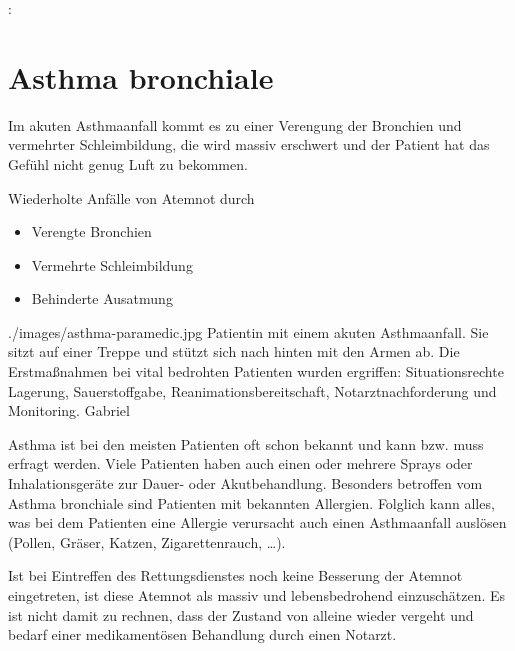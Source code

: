  {%
: 
\\
}{}

 

\nocite{Wuttig2009}


\section{Asthma bronchiale}
\label{topic:asthma-bronchiale}

{%
Im akuten Asthmaanfall kommt es zu einer Verengung der
Bronchien und vermehrter Schleimbildung, die 
wird massiv erschwert und der Patient hat das Gefühl nicht
genug Luft zu bekommen.
}{%
Wiederholte Anfälle von Atemnot durch
\begin{itemize}
  \item Verengte Bronchien
  \item Vermehrte Schleimbildung
  \item Behinderte Ausatmung
\end{itemize}
}
{./images/asthma-paramedic.jpg}
{Patientin mit einem akuten Asthmaanfall. Sie sitzt auf einer Treppe und stützt sich nach hinten mit
den Armen ab. Die Erstmaßnahmen bei vital bedrohten
Patienten wurden ergriffen: Situationsrechte Lagerung,
Sauerstoffgabe, Reanimationsbereitschaft, Notarztnachforderung und Monitoring.\label{fig:asthma-paramedic}
}
{Gabriel}

Asthma ist bei den meisten Patienten oft schon bekannt und
kann bzw. muss erfragt werden. Viele Patienten haben auch
einen oder mehrere Sprays oder Inhalationsgeräte zur Dauer-
oder Akutbehandlung. 
Besonders betroffen vom Asthma bronchiale sind Patienten
mit bekannten Allergien. Folglich kann alles, was bei dem
Patienten eine Allergie verursacht auch einen Asthmaanfall
auslösen (Pollen, Gräser, Katzen, Zigarettenrauch, \ldots). 

Ist bei Eintreffen des Rettungsdienstes noch keine
Besserung der Atemnot eingetreten, ist diese Atemnot als
massiv und lebensbedrohend einzuschätzen. Es ist nicht
damit zu rechnen, dass der Zustand von alleine wieder
vergeht und bedarf einer medikamentösen Behandlung durch einen
Notarzt. 

